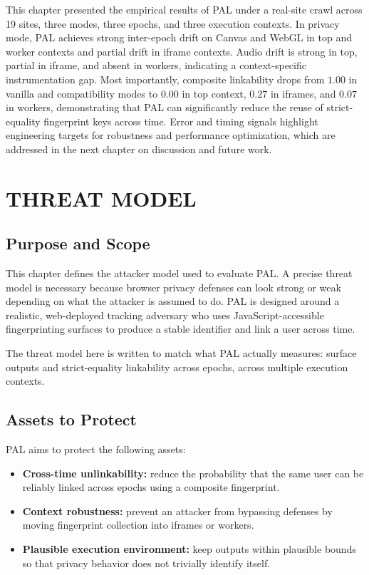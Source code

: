 \documentclass[11pt]{report}
\begin{document}
This chapter presented the empirical results of PAL under a real-site crawl across 19 sites, three modes, three epochs, and three execution contexts. In privacy mode, PAL achieves strong inter-epoch drift on Canvas and WebGL in top and worker contexts and partial drift in iframe contexts. Audio drift is strong in top, partial in iframe, and absent in workers, indicating a context-specific instrumentation gap. Most importantly, composite linkability drops from $1.00$ in vanilla and compatibility modes to $0.00$ in top context, $0.27$ in iframes, and $0.07$ in workers, demonstrating that PAL can significantly reduce the reuse of strict-equality fingerprint keys across time. Error and timing signals highlight engineering targets for robustness and performance optimization, which are addressed in the next chapter on discussion and future work.









\chapter{THREAT MODEL}

\section{Purpose and Scope}

This chapter defines the attacker model used to evaluate PAL. A precise threat model is necessary because browser privacy defenses can look strong or weak depending on what the attacker is assumed to do. PAL is designed around a realistic, web-deployed tracking adversary who uses JavaScript-accessible fingerprinting surfaces to produce a stable identifier and link a user across time.

The threat model here is written to match what PAL actually measures: surface outputs and strict-equality linkability across epochs, across multiple execution contexts.

\section{Assets to Protect}

PAL aims to protect the following assets:

\begin{itemize}
    \item \textbf{Cross-time unlinkability:} reduce the probability that the same user can be reliably linked across epochs using a composite fingerprint.
    \item \textbf{Context robustness:} prevent an attacker from bypassing defenses by moving fingerprint collection into iframes or workers.
    \item \textbf{Plausible execution environment:} keep outputs within plausible bounds so that privacy behavior does not trivially identify itself.
\end{itemize}
\end{document}
